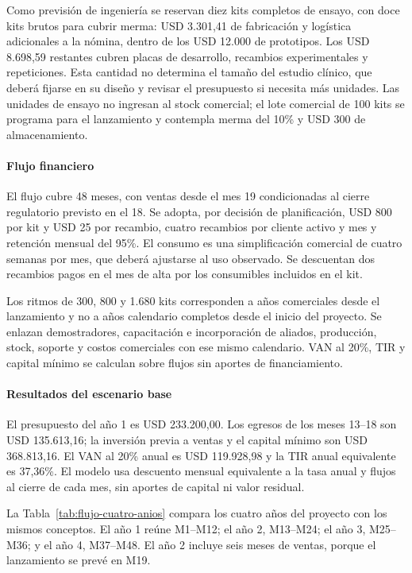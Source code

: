 Como previsión de ingeniería se reservan diez kits completos de ensayo, con doce kits brutos para cubrir merma: USD 3.301,41 de fabricación y logística adicionales a la nómina, dentro de los USD 12.000 de prototipos. Los USD 8.698,59 restantes cubren placas de desarrollo, recambios experimentales y repeticiones. Esta cantidad no determina el tamaño del estudio clínico, que deberá fijarse en su diseño y revisar el presupuesto si necesita más unidades. Las unidades de ensayo no ingresan al stock comercial; el lote comercial de 100 kits se programa para el lanzamiento y contempla merma del 10\% y USD 300 de almacenamiento.
\paragraph{Flujo financiero}
El flujo cubre 48 meses, con ventas desde el mes 19 condicionadas al cierre regulatorio previsto en el 18. Se adopta, por decisión de planificación, USD 800 por kit y USD 25 por recambio, cuatro recambios por cliente activo y mes y retención mensual del 95\%. El consumo es una simplificación comercial de cuatro semanas por mes, que deberá ajustarse al uso observado. Se descuentan dos recambios pagos en el mes de alta por los consumibles incluidos en el kit.

Los ritmos de 300, 800 y 1.680 kits corresponden a años comerciales desde el lanzamiento y no a años calendario completos desde el inicio del proyecto. Se enlazan demostradores, capacitación e incorporación de aliados, producción, stock, soporte y costos comerciales con ese mismo calendario. VAN al 20\%, TIR y capital mínimo se calculan sobre flujos sin aportes de financiamiento.
\paragraph{Resultados del escenario base}
El presupuesto del año 1 es USD 233.200,00. Los egresos de los meses 13--18 son USD 135.613,16; la inversión previa a ventas y el capital mínimo son USD 368.813,16. El VAN al 20\% anual es USD 119.928,98 y la TIR anual equivalente es 37,36\%. El modelo usa descuento mensual equivalente a la tasa anual y flujos al cierre de cada mes, sin aportes de capital ni valor residual.

La Tabla~\ref{tab:flujo-cuatro-anios} compara los cuatro años del proyecto con los mismos conceptos. El año 1 reúne M1--M12; el año 2, M13--M24; el año 3, M25--M36; y el año 4, M37--M48. El año 2 incluye seis meses de ventas, porque el lanzamiento se prevé en M19.

